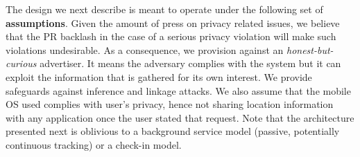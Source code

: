 


The design we next describe is meant to operate under the following set of \textbf{assumptions}. 
Given the amount of press on privacy related issues, we believe that the PR backlash in the case of a serious privacy violation will make such violations undesirable. As a consequence, we provision against an \emph{honest-but-curious} advertiser. It means the adversary complies with the system but it can exploit the information that is gathered for its own interest. We provide safeguards against inference and linkage attacks. We also assume that the mobile OS used complies with user's privacy, hence not sharing location information with any application once the user stated that request. 
Note that the architecture presented next is oblivious to a background service model (passive, potentially continuous tracking) or a check-in model. 



